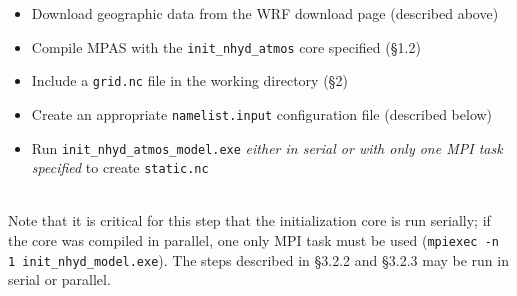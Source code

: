 \begin{itemize}
\item Download geographic data from the WRF download page (described above) 
\item Compile MPAS with the {\tt init\_nhyd\_atmos} core specified (\S 1.2)
\item Include a {\tt grid.nc} file in the working directory (\S 2)
\item Create an appropriate {\tt namelist.input} configuration file (described below)
\item Run {\tt init\_nhyd\_atmos\_model.exe} {\em either in serial or with only one MPI task specified} to create {\tt static.nc}
\end{itemize}~\\
Note that it is critical for this step that the initialization core is run serially; if the core was compiled in parallel, one only MPI task must be used ({\tt mpiexec -n 1 init\_nhyd\_model.exe}).  The steps described in \S 3.2.2 and \S 3.2.3 may be run in serial or parallel.

